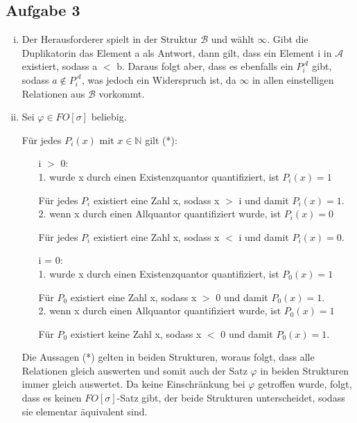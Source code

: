 \documentclass[a4paper,10pt]{article}
\begin{document}
\subsection*{Aufgabe 3}
	\begin{enumerate}[(i)]
		\item
			Der Herausforderer spielt in der Struktur $\mathcal{B}$ und wählt $\infty$. Gibt die Duplikatorin das Element a als Antwort, dann 					gilt, dass ein Element i in $\mathcal{A}$ existiert, sodass a $<$ b. Daraus folgt aber, dass es ebenfalls ein $P_i^{\mathcal{A}}$ 					gibt, sodass $a \notin P_i^{\mathcal{A}}$, was jedoch ein Widerspruch ist, da $\infty$ in allen einstelligen Relationen aus 						$\mathcal{B}$ vorkommt.
		\item
			Sei $\varphi \in FO[\sigma]$ beliebig.
			
			Für jedes $P_i(x)$ mit $x \in \mathbb{N}$ gilt (*): \\
			\begin{itemize}
				\item[i $>$ 0:] ~\\
					1. wurde x durch einen Existenzquantor quantifiziert, ist $P_i(x) = 1$
				
					Für jedes $P_i$ existiert eine Zahl x, sodass x $>$ i und damit $P_i(x) = 1$. \\
					
					2. wenn x durch einen Allquantor quantifiziert wurde, ist $P_i(x) = 0$
					
					Für jedes $P_i$ existiert eine Zahl x, sodass x $<$ i und damit $P_i(x) = 0$. \\
						
				\item[i = 0:] ~\\
					1. wurde x durch einen Existenzquantor quantifiziert, ist $P_0(x) = 1$
				
					Für $P_0$ existiert eine Zahl x, sodass x $>$ 0 und damit $P_0(x) = 1$. \\
					
					2. wenn x durch einen Allquantor quantifiziert wurde, ist $P_0(x) = 1$
					
					Für $P_0$ existiert keine Zahl x, sodass x $<$ 0 und damit $P_0(x) = 1$. \\
			\end{itemize}
			
			Die Aussagen (*) gelten in beiden Strukturen, woraus folgt, dass alle Relationen gleich auswerten und somit auch der Satz $\varphi$ 				in beiden Strukturen immer gleich auswertet. Da keine Einschränkung bei $\varphi$ getroffen wurde, folgt, dass es keinen 							$FO[\sigma]$-Satz gibt, der beide Strukturen unterscheidet, sodass sie elementar äquivalent sind.
			
			
			
	\end{enumerate}
\end{document}
